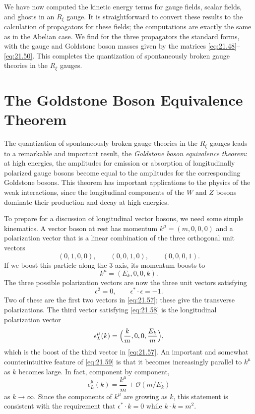 We have now computed the kinetic energy terms for gauge fields, scalar
fields, and ghosts in an $R_\xi$ gauge.  It is straightforward to convert
these results to the calculation of propagators for these fields; the
computations are exactly the same as in the Abelian case.  We find for the
three propagators the standard forms, with the gauge and Goldstone boson
masses given by the matrices \eqref{eq:21.48}--\eqref{eq:21.50}.  This
completes the quantization of spontaneously broken gauge theories in the
$R_\xi$ gauges.

\section{The Goldstone Boson Equivalence Theorem}

The quantization of spontaneously broken gauge theories in the $R_\xi$ gauges
leads to a remarkable and important result, the \emph{Goldstone boson
equivalence theorem}: at high energies, the amplitudes for emission or
absorption of longitudinally polarized gauge bosons become equal to the
amplitudes for the corresponding Goldstone bosons.  This theorem has
important applications to the physics of the weak interactions, since the
longitudinal components of the $W$ and $Z$ bosons dominate their production
and decay at high energies.

To prepare for a discussion of longitudinal vector bosons, we need some
simple kinematics.  A vector boson at rest has momentum
$k^\mu = (m, 0, 0, 0)$ and a polarization vector that is a linear combination
of the three orthogonal unit vectors
\begin{equation}
  (0, 1, 0, 0),\qquad (0, 0, 1, 0),\qquad (0, 0, 0, 1) .
  \label{eq:21.57}
\end{equation}
If we boost this particle along the 3 axis, its momentum boosts to
\begin{equation}
  k^\mu = (E_k, 0, 0, k) .
\end{equation}
The three possible polarization vectors are now the three unit vectors
satisfying
\begin{equation}
  \epsilon^2 = 0,\qquad \epsilon^{*}\cdot\epsilon = -1 .
  \label{eq:21.58}
\end{equation}
Two of these are the first two vectors in \eqref{eq:21.57}; these give the
transverse polarizations.  The third vector satisfying \eqref{eq:21.58} is
the longitudinal polarization vector
\begin{equation}
  \epsilon^\mu_L(k) = \Bigl( \frac{k}{m}, 0, 0, \frac{E_k}{m} \Bigr) ,
  \label{eq:21.59}
\end{equation}
which is the boost of the third vector in \eqref{eq:21.57}.  An important
and somewhat counterintuitive feature of \eqref{eq:21.59} is that it becomes
increasingly parallel to $k^\mu$ as $k$ becomes large.  In fact, component by
component,
\begin{equation}
  \epsilon^\mu_L(k) = \frac{k^\mu}{m} + \mathcal{O}(m/E_k)
  \label{eq:21.60}
\end{equation}
as $k\to\infty$.  Since the components of $k^\mu$ are growing as $k$, this
statement is consistent with the requirement that $\epsilon^{*}\cdot k = 0$
while $k\cdot k = m^2$.

